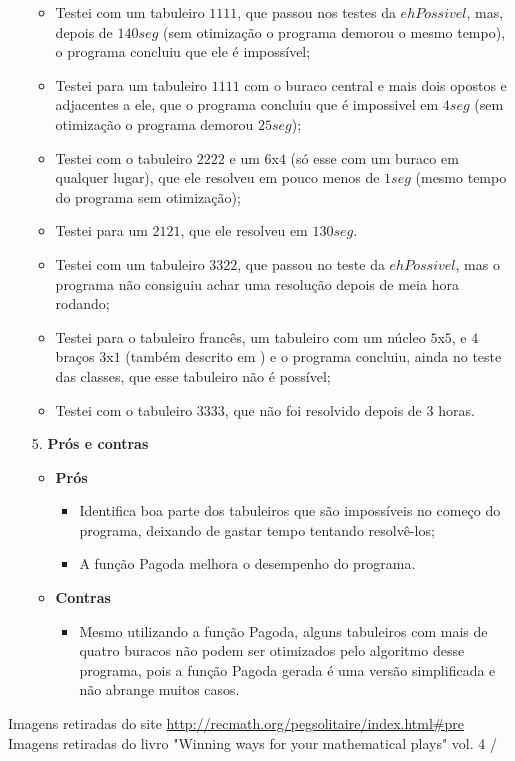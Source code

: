 \documentclass[12pt, a4paper]{article} %
\begin{document}
\begin{enumerate}
\begin{itemize}
\item Testei com um tabuleiro $1111$, que passou nos testes da $ehPossivel$, mas, depois de $140seg$ (sem otimização o programa demorou o mesmo tempo), o programa concluiu que ele é impossível;
\item Testei para um tabuleiro $1111$ com o buraco central e mais dois opostos e adjacentes a ele, que o programa concluiu que é impossivel em $4seg$ (sem otimização o programa demorou $25 seg$);
\item Testei com o tabuleiro $2222$ e um $6$x$4$ (só esse com um buraco em qualquer lugar), que ele resolveu em pouco menos de $1seg$ (mesmo tempo do programa sem otimização);
\item Testei para um $2121$, que ele resolveu em $130seg$.
\item Testei com um tabuleiro $3322$, que passou no teste da $ehPossivel$, mas o programa não consiguiu achar uma resolução depois de meia hora rodando;
\item Testei para o tabuleiro francês, um tabuleiro com um núcleo $5$x$5$, e $4$ braços $3$x$1$ (também descrito em \cite{recmath}) e o programa concluiu, ainda no teste das classes, que esse tabuleiro não é possível;
\item Testei com o tabuleiro $3333$, que não foi resolvido depois de 3 horas.\\[0.5cm]
\end{itemize}
\large
\item[5.]\textbf{Prós e contras}
\normalsize\\[-0.5cm]
\begin{itemize}
\item \textbf{Prós}\\[-0.5cm]
\begin{itemize}
\item Identifica boa parte dos tabuleiros que são impossíveis no começo do programa, deixando de gastar tempo tentando resolvê-los;
\item A função Pagoda melhora o desempenho do programa.
\end{itemize}
\item \textbf{Contras}
\begin{itemize}
\item Mesmo utilizando a função Pagoda, alguns tabuleiros com mais de quatro buracos não podem ser otimizados pelo algoritmo desse programa, pois a função Pagoda gerada é uma versão simplificada e não abrange muitos casos.  
\end{itemize}
\end{itemize}
\end{enumerate}
\begin{thebibliography}{3}
 Imagens retiradas do site \url{http://recmath.org/pegsolitaire/index.html#pre}
 Imagens retiradas do livro "Winning ways for your mathematical plays" vol. 4
/\end{thebibliography}
\end{document}
